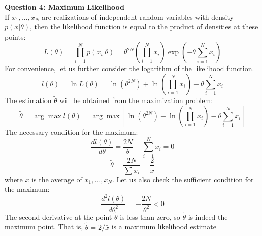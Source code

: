 \documentclass[12pt]{article}
\begin{document}
	
	\textbf{Question 4: Maximum Likelihood}\\
	If $x_1,...,x_N$ are realizations of independent random variables with density $p(x|\theta)$, then the likelihood function is equal to the product of densities at these points:
	$$L(\theta) = \prod_{i=1}^{N} p(x_i|\theta) = \theta^{2N}\left(\prod_{i=1}^{N}x_i\right)\exp\left(-\theta\sum_{i=1}^{N}x_i\right)$$
	For convenience, let us further consider the logarithm of the likelihood function.
	$$ l(\theta) = \ln L(\theta) = \ln \left(\theta^{2N}\right) + \ln\left(\prod_{i=1}^{N}x_i\right) -\theta\sum_{i=1}^{N}x_i $$
	The estimation $\tilde\theta$  will be obtained from the maximization problem:
	$$\tilde\theta = \arg \max l(\theta) = \arg\max\left[ \ln \left(\theta^{2N}\right) + \ln\left(\prod_{i=1}^{N}x_i\right) -\theta\sum_{i=1}^{N}x_i \right]$$
	The necessary condition for the maximum: 
	$$\frac{dl(\theta)}{d\theta} = \frac{2N}{\theta}-\sum_{i=1}^{N}x_i = 0$$
	$$\tilde\theta = \frac{2N}{\sum x_i} = \frac{2}{\bar x}$$
	where $\bar x$ is the average of $x_1,...,x_N$.
	Let us also check the sufficient condition for the maximum:
	$$\frac{d^2 l(\theta)}{d\theta^2} =- \frac{2N}{\theta^2} < 0$$
	The second derivative at the point $\tilde{\theta}$ is less than zero, so $\tilde{\theta}$ is indeed the maximum point. That is, 	$\tilde\theta  = 2/\bar x$ is a maximum likelihood estimate
	
	
\end{document}
